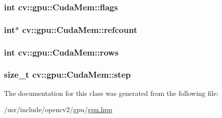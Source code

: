 \hypertarget{classcv_1_1gpu_1_1CudaMem_a312c10159c12ed29880b32bf32fedebc}{
\subsubsection[{flags}]{\setlength{\rightskip}{0pt plus 5cm}int cv\-::gpu\-::\-Cuda\-Mem\-::flags}}\label{classcv_1_1gpu_1_1CudaMem_a312c10159c12ed29880b32bf32fedebc}
\hypertarget{classcv_1_1gpu_1_1CudaMem_a6ade5baf301830405c01394c322087d2}{
\subsubsection[{refcount}]{\setlength{\rightskip}{0pt plus 5cm}int$\ast$ cv\-::gpu\-::\-Cuda\-Mem\-::refcount}}\label{classcv_1_1gpu_1_1CudaMem_a6ade5baf301830405c01394c322087d2}
\hypertarget{classcv_1_1gpu_1_1CudaMem_a7a9d3e9cac593f025c71e86a4e855f15}{
\subsubsection[{rows}]{\setlength{\rightskip}{0pt plus 5cm}int cv\-::gpu\-::\-Cuda\-Mem\-::rows}}\label{classcv_1_1gpu_1_1CudaMem_a7a9d3e9cac593f025c71e86a4e855f15}
\hypertarget{classcv_1_1gpu_1_1CudaMem_aeac8b2b4d5cc098a8045902083df1ae2}{
\subsubsection[{step}]{\setlength{\rightskip}{0pt plus 5cm}size\-\_\-t cv\-::gpu\-::\-Cuda\-Mem\-::step}}\label{classcv_1_1gpu_1_1CudaMem_aeac8b2b4d5cc098a8045902083df1ae2}


The documentation for this class was generated from the following file\-:\begin{DoxyCompactItemize}
\item 
/usr/include/opencv2/gpu/\hyperlink{gpu_2gpu_8hpp}{gpu.\-hpp}\end{DoxyCompactItemize}
